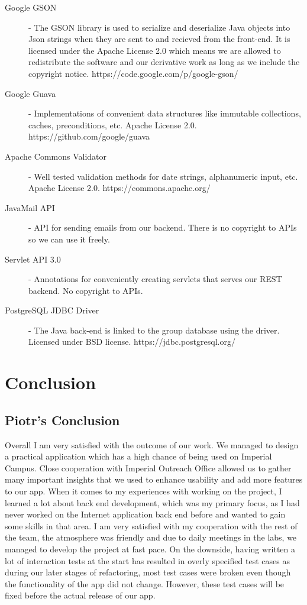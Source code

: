 \documentclass[10pt,a4paper]{article}
\begin{document}
\begin{description}
\item[Google GSON] - The GSON library is used to serialize and deserialize Java 
objects into Json strings when they are sent to and recieved from the front-end. 
It is licensed under the Apache License 2.0 which means we are allowed to redistribute
the software and our derivative work as long as we include the copyright notice.
https://code.google.com/p/google-gson/
\item[Google Guava] - Implementations of convenient data structures like immutable 
collections, caches, preconditions, etc. Apache License 2.0. https://github.com/google/guava
\item[Apache Commons Validator] - Well tested validation methods for date strings, 
alphanumeric input, etc. Apache License 2.0. https://commons.apache.org/
\item[JavaMail API] - API for sending emails from our backend. There is no
copyright to APIs so we can use it freely.
\item[Servlet API 3.0] - Annotations for conveniently creating servlets that
serves our REST backend. No copyright to APIs.
\item[PostgreSQL JDBC Driver] - The Java back-end is linked to the group 
database using the driver. Licensed under BSD license. 
https://jdbc.postgresql.org/
\end{description}

\section{Conclusion}
 \subsection{Piotr's Conclusion}
 Overall I am very satisfied with the outcome of our work. We managed to design 
a practical application which has a high chance of being used on Imperial 
Campus. Close cooperation with Imperial Outreach Office allowed us to gather 
many important insights that we used to enhance usability and add more features 
to our app. When it comes to my experiences with working on the project, I 
learned a lot about back end development, which was my primary focus, as I had 
never worked on the Internet application back end before and wanted to gain some 
skills in that area. I am very satisfied with my cooperation with the rest of 
the team, the atmosphere was friendly and due to daily meetings in the labs, we 
managed to develop the project at fast pace. On the downside, having written a lot of 
interaction tests at the start has resulted in overly specified test cases
as during our later stages of refactoring, most test cases were broken even though
the functionality of the app did not change. However, these test cases will be
fixed before the actual release of our app.
 
\end{document}
